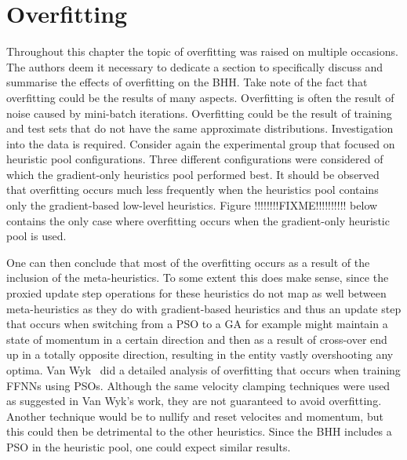 \section{Overfitting}
\label{sec:results:overfitting}

Throughout this chapter the topic of overfitting was raised on multiple occasions. The authors deem it necessary to dedicate a section to specifically discuss and summarise the effects of overfitting on the \Ac{BHH}. Take note of the fact that overfitting could be the results of many aspects. Overfitting is often the result of noise caused by mini-batch iterations. Overfitting could be the result of training and test sets that do not have the same approximate distributions. Investigation into the data is required. Consider again the experimental group that focused on heuristic pool configurations. Three different configurations were considered of which the gradient-only heuristics pool performed best. It should be observed that overfitting occurs much less frequently when the heuristics pool contains only the gradient-based low-level heuristics. Figure !!!!!!!!FIXME!!!!!!!!!! below contains the only case where overfitting occurs when the gradient-only heuristic pool is used.




One can then conclude that most of the overfitting occurs as a result of the inclusion of the meta-heuristics. To some extent this does make sense, since the proxied update step operations for these heuristics do not map as well between meta-heuristics as they do with gradient-based heuristics and thus an update step that occurs when switching from a \acs{PSO} to a \acs{GA} for example might maintain a state of momentum in a certain direction and then as a result of cross-over end up in a totally opposite direction, resulting in the entity vastly overshooting any optima. Van Wyk~\cite{ref:vanwyk:2014} did a detailed analysis of overfitting that occurs when training \acp{FFNN} using \acp{PSO}. Although the same velocity clamping techniques were used as suggested in Van Wyk's work, they are not guaranteed to avoid overfitting. Another technique would be to nullify and reset velocites and momentum, but this could then be detrimental to the other heuristics. Since the \Ac{BHH} includes a \acs{PSO} in the heuristic pool, one could expect similar results.


